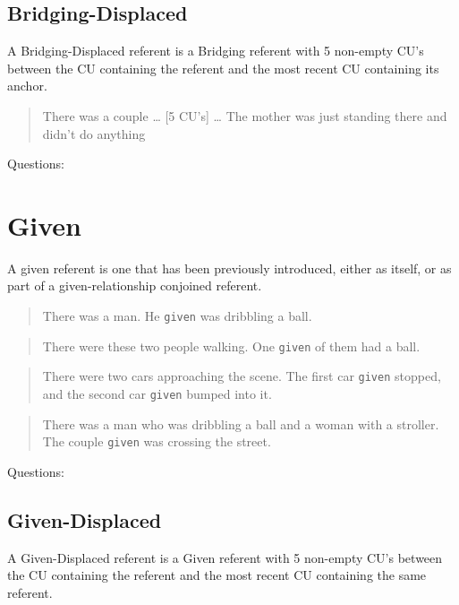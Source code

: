 \documentclass[
]{book}
\begin{document}
\hypertarget{bridging-displaced}{%
\subsection{Bridging-Displaced}\label{bridging-displaced}}

A Bridging-Displaced referent is a Bridging referent with 5 non-empty CU's between the CU containing the referent and the most recent CU containing its anchor.

\begin{quote}
There was a couple \ldots{}
{[}5 CU's{]} \ldots{}
The mother was just standing there and didn't do anything
\end{quote}

Questions:

\hypertarget{given}{%
\section{Given}\label{given}}

A given referent is one that has been previously introduced, either as itself, or as part of a given-relationship conjoined referent.

\begin{quote}
There was a man.
He \texttt{given} was dribbling a ball.
\end{quote}

\begin{quote}
There were these two people walking.
One \texttt{given} of them had a ball.
\end{quote}

\begin{quote}
There were two cars approaching the scene.
The first car \texttt{given} stopped, and the second car \texttt{given} bumped into it.
\end{quote}

\begin{quote}
There was a man who was dribbling a ball and a woman with a stroller.
The couple \texttt{given} was crossing the street.
\end{quote}

Questions:

\hypertarget{given-displaced}{%
\subsection{Given-Displaced}\label{given-displaced}}

A Given-Displaced referent is a Given referent with 5 non-empty CU's between the CU containing the referent and the most recent CU containing the same referent.
\end{document}
